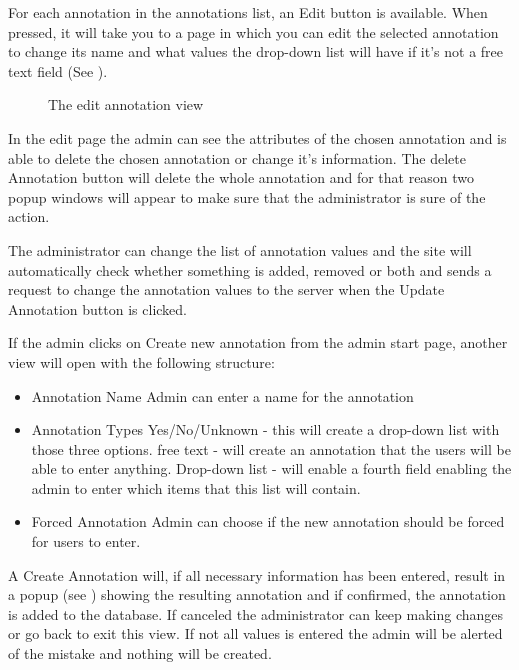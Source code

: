 For each annotation in the annotations list, an Edit button is available. 
When pressed, it will take you to a page in which you can edit the selected annotation to change its name and what values the drop-down list will have if it's not a free text field (See ). 

\begin{sidewaysfigure}[h]
 \caption{The edit annotation view}
 \label{adm_web_editView}
\end{sidewaysfigure}
In the edit page the admin can see the attributes of the chosen annotation and is able to delete the chosen annotation or change it's information.
The delete Annotation button will delete the whole annotation and for that reason two popup windows will appear to make sure that the administrator is sure of the action.

The administrator can change the list of annotation values and the site will automatically check whether 
something is added, removed or both and sends a request to change the annotation values to the server when the Update Annotation button is clicked.

If the admin clicks on Create new annotation from the admin start page, another view will open with the following structure:
\begin{itemize}
 \item Annotation Name
 \subitem Admin can enter a name for the annotation
 
 \item Annotation Types
 \subitem Yes/No/Unknown - this will create a drop-down list with those three options.
 \subitem free text - will create an annotation that the users will be able to enter anything.
 \subitem Drop-down list - will enable a fourth field enabling the admin to enter which items that this list will contain.
 
 \item Forced Annotation
 \subitem Admin can choose if the new annotation should be forced for users to enter. 
\end{itemize}

A Create Annotation will, if all necessary information has been entered, result in a popup (see ) showing the resulting annotation and if confirmed, the annotation is added to the database. 
If canceled the administrator can keep making changes or go back to exit this view. If not all values is entered the admin will be alerted of the mistake and nothing will be created.

